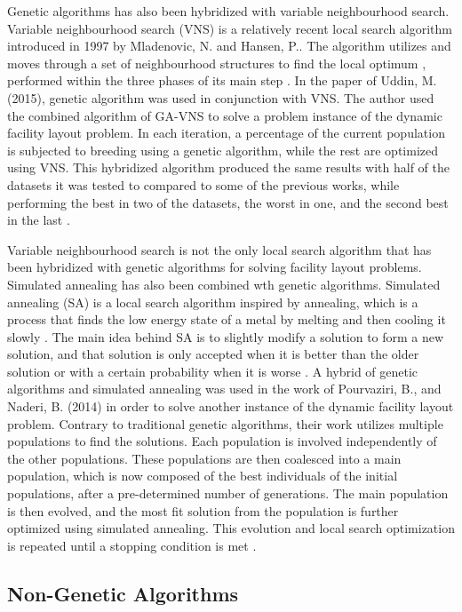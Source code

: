 Genetic algorithms has also been hybridized with variable neighbourhood search. Variable neighbourhood search (VNS) is a relatively recent local search algorithm introduced in 1997 by Mladenovic, N. and Hansen, P.. The algorithm utilizes and moves through a set of neighbourhood structures to find the local optimum \cite{Hansen2018}, performed within the three phases of its main step \cite{Hansen2017}. In the paper of Uddin, M. (2015), genetic algorithm was used in conjunction with VNS. The author used the combined algorithm of GA-VNS to solve a problem instance of the dynamic facility layout problem. In each iteration, a percentage of the current population is subjected to breeding using a genetic algorithm, while the rest are optimized using VNS. This hybridized algorithm produced the same results with half of the datasets it was tested to compared to some of the previous works, while performing the best in two of the datasets, the worst in one, and the second best in the last \cite{Uddin2015}.

Variable neighbourhood search is not the only local search algorithm that has been hybridized with genetic algorithms for solving facility layout problems. Simulated annealing has also been combined wth genetic algorithms. Simulated annealing (SA) is a local search algorithm inspired by annealing, which is a process that finds the low energy state of a metal by melting and then cooling it slowly \cite{Lai1997}. The main idea behind SA is to slightly modify a solution to form a new solution, and that solution is only accepted when it is better than the older solution or with a certain probability when it is worse \cite{Dueck1993}. A hybrid of genetic algorithms and simulated annealing was used in the work of Pourvaziri, B., and Naderi, B. (2014) in order to solve another instance of the dynamic facility layout problem. Contrary to traditional genetic algorithms, their work utilizes multiple populations to find the solutions. Each population is involved independently of the other populations. These populations are then coalesced into a main population, which is now composed of the best individuals of the initial populations, after a pre-determined number of generations. The main population is then evolved, and the most fit solution from the population is further optimized using simulated annealing. This evolution and local search optimization is repeated until a stopping condition is met \cite{Pourvaziri2014}. 

\subsection{Non-Genetic Algorithms}


